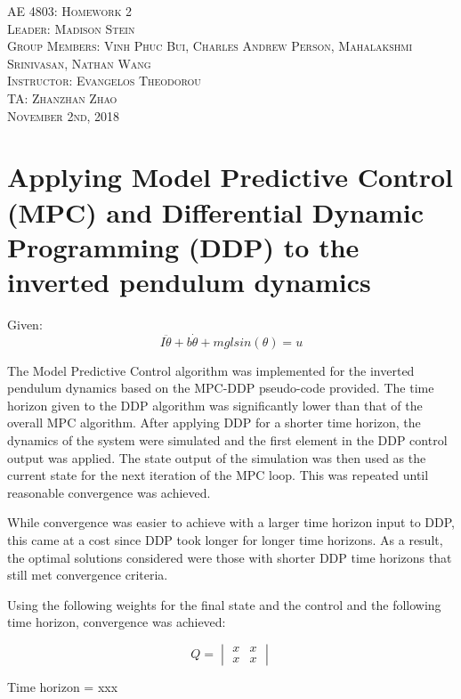 \documentclass{article}
\begin{document}
\begin{titlepage}
    \center
    \textsc{\LARGE AE 4803: Homework 2}\\[1.5cm]
    \textsc{\Large Leader: Madison Stein}\\[0.5cm]
    \textsc{\Large Group Members: Vinh Phuc Bui, Charles Andrew Person, Mahalakshmi Srinivasan, Nathan Wang}\\[2cm]
    \textsc{\large Instructor: Evangelos Theodorou}\\[0.5cm]
    \textsc{\large TA: Zhanzhan Zhao}\\[1cm]
    \textsc{\large November 2nd, 2018}
\end{titlepage}

\section{Applying Model Predictive Control (MPC) and Differential Dynamic Programming (DDP) to the inverted pendulum dynamics}

Given:
\begin{equation}
I\ddot{\theta} + b\dot{\theta} + mglsin(\theta) = u
\end{equation}

The Model Predictive Control algorithm was implemented for the inverted pendulum dynamics based on the MPC-DDP pseudo-code provided. The time horizon given to the DDP algorithm was significantly lower than that of the overall MPC algorithm. After applying DDP for a shorter time horizon, the dynamics of the system were simulated and the first element in the DDP control output was applied. The state output of the simulation was then used as the current state for the next iteration of the MPC loop. This was repeated until reasonable convergence was achieved.


While convergence was easier to achieve with a larger time horizon input to DDP, this came at a cost since DDP took longer for longer time horizons. As a result, the optimal solutions considered were those with shorter DDP time horizons that still met convergence criteria.


Using the following weights for the final state and the control and the following time horizon, convergence was achieved:

$$
Q = 
\begin{vmatrix}
x & x \\ x & x
\end{vmatrix}
$$

\begin{center}
Time horizon = xxx
\end{center}
\end{document}
